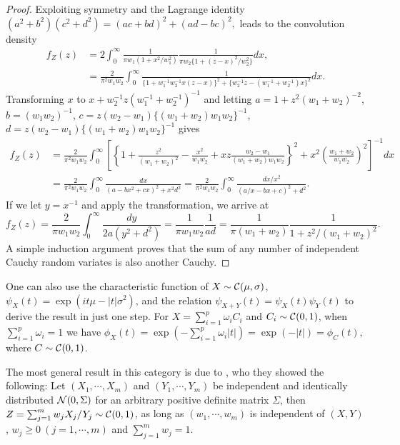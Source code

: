 \documentclass[lineno]{biometrika}
\begin{document}
\begin{proof}
Exploiting symmetry and the Lagrange identity $(a^2 + b^2)(c^2 + d^2) = (ac+bd)^2 + (ad-bc)^2,$ leads to the convolution density
\begin{align*} 
  f_Z(z) &= 2 \int_{0}^{\infty} 
  \frac{1}{ \pi w_1 (1+ x^2/w_1^2)} \frac{1}{\pi w_2 \{1+ (z-x)^2 / w_2^2 \} } dx, 
  \\
  & = \frac{2}{\pi^2 w_1 w_2} \int_{0}^{\infty} 
  \frac{1}{\{1+ w_1^{-1} w_2^{-1} x (z-x) \}^2 + \{w_2^{-1}z - (w_1^{-1}+ w_2^{-1}) x \}^2 } dx.
\end{align*}
Transforming $x$ to $x + w_2^{-1}z (w_1^{-1} + w_2^{-1})^{-1}$ and letting $a = 1 + z^2(w_1+w_2)^{-2}$, $b =(w_1 w_2)^{-1}$, $c = z (w_2-w_1) \{(w_1+w_2) w_1 w_2\}^{-1}$, $d = z (w_2-w_1)\{(w_1+w_2) w_1 w_2\}^{-1}$ gives
\begin{align*}
  f_Z(z) &= \frac{2}{\pi^2 w_1 w_2} \int_{0}^{\infty} 
  \left[ 
    \left\{ 1 + \frac{z^2}{(w_1+w_2)^2} - \frac{x^2}{w_1w_2} + 
      xz \frac{w_2-w_1}{(w_1+w_2) w_1 w_2} \right\}^2 + 
    x^2 \left(\frac{w_1 + w_2}{w_1w_2} \right)^2 
  \right]^{-1} dx 
  \\
  &= \frac{2}{\pi^2 w_1 w_2} \int_{0}^{\infty} 
  \frac{dx}{\left( a - b x^2 + cx \right)^2 + x^2 d^2} 
  = \frac{2}{\pi^2 w_1 w_2} \int_{0}^{\infty} 
  \frac{dx/x^2}{\left(a/x - bx + c \right)^2 + d^2 }.
\end{align*}
If we let $y = x^{-1}$ and apply the \CS{} transformation, we arrive at 
\[
  f_Z(z) = \frac{2}{\pi w_1 w_2} \int_{0}^{\infty} \frac{dy}{2a (y^2 + d^2)} 
  = \frac{1}{\pi w_1 w_2} \frac{1}{ad}= \frac{1}{\pi (w_1+w_2)} \frac{1}{1+ z^2/(w_1+w_2)^2}.
\]
A simple induction argument proves that the sum of any number of independent
Cauchy random variates is also another Cauchy.
\end{proof}

One can also use the characteristic function of $X \sim \mathcal{C}(\mu, \sigma)$, $\psi_X(t) = \exp(it \mu - |t| \sigma^2)$, and the relation $\psi_{X+Y}(t) = \psi_X(t) \psi_Y(t)$ to derive the result in just one step. For $X = \sum_{i=1}^{p} \omega_i C_i$ and $C_i \sim \mathcal{C}(0,1)$, when $\sum_{i=1}^{p} \omega_i = 1$ we have 
$\phi_X(t) = \exp\left(-\sum_{i=1}^{p}\omega_i |t|\right) = \exp(-|t|) = \phi_C(t),$ where $C \sim \mathcal{C}(0, 1)$. 

The most general result in this category is due to \cite{pillai2015unexpected},
who they showed the following: 
Let $(X_1,\cdots,X_m)$ and $(Y_1, \cdots, Y_m)$ be independent and
identically distributed $\mathcal{N}(0, \Sigma)$ for an arbitrary
positive definite matrix $\Sigma$, then 
$Z = \sum_{j=1}^{m} w_j X_j / Y_j \sim \mathcal{C}(0, 1)$, 
as long as $(w_1, \cdots, w_m)$ is independent of $(X, Y)$,
$w_j \geq 0\ (j = 1, \cdots, m)$ and $\sum_{j=1}^{m} w_j = 1$. 
\end{document}
